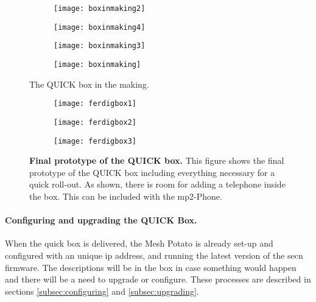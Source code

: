 \begin{figure}
        \centering
        \begin{subfigure}[t]{0.4\textwidth}
                \texttt{[image: boxinmaking2]}
                \label{fig:boxinmaking2}
        \end{subfigure}
        \begin{subfigure}[t]{0.4\textwidth}
                \texttt{[image: boxinmaking4]}
                \label{fig:boxinmaking}
        \end{subfigure}
         \begin{subfigure}[t]{0.3\textwidth}
                \texttt{[image: boxinmaking3]} 
                \label{fig:boxinmaking3}
        \end{subfigure}
        \begin{subfigure}[t]{0.4\textwidth}
                \texttt{[image: boxinmaking]} 
                \label{fig:boxinmaking4}
        \end{subfigure}
\caption{The QUICK box in the making.} \label{fig:boxinmaking}
\end{figure}

\begin{figure}
        \centering
        \begin{subfigure}[t]{0.4\textwidth}
                \texttt{[image: ferdigbox1]}
                \label{fig:ferdigbox1}
        \end{subfigure}
        \begin{subfigure}[t]{0.4\textwidth}
                \texttt{[image: ferdigbox2]}
                \label{fig:ferdigbox2}
        \end{subfigure}
         \begin{subfigure}[t]{0.81\textwidth}
                \texttt{[image: ferdigbox3]} 
                \label{fig:ferdigbox3}
        \end{subfigure}
\caption[Final prototype of the QUICK box]{\textbf{Final prototype of the QUICK box.} This figure shows the final prototype of the QUICK box including everything necessary for a quick roll-out. As shown, there is room for adding a telephone inside the box. This can be included with the \gls{mp2}-Phone.} \label{fig:ferdigbox}
\end{figure}


\paragraph{Configuring and upgrading the QUICK Box.}
When the \gls{quick} box is delivered, the Mesh Potato is already set-up and configured with an unique \gls{ip} address, and running the latest version of the \gls{secn} firmware. The descriptions will be in the box in case something would happen and there will be a need to upgrade or configure. These processes are described in sections \ref{subsec:configuring} and \ref{subsec:upgrading}.

